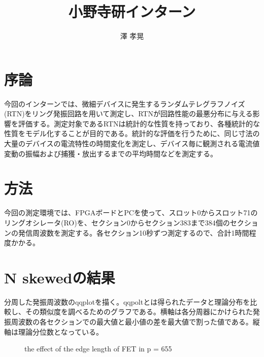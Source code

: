 \documentclass{jsarticle}
\begin{document}
\title{小野寺研インターン}
\author{澤 孝晃}
\maketitle

\section{序論}

今回のインターンでは、微細デバイスに発生するランダムテレグラフノイズ(RTN)をリング発振回路を用いて測定し、RTNが回路性能の最悪分布に与える影響を評価する。測定対象であるRTNは統計的な性質を持っており、各種統計的な性質をモデル化することが目的である。統計的な評価を行うために、同じ寸法の大量のデバイスの電流特性の時間変化を測定し、デバイス毎に観測される電流値変動の振幅および捕獲・放出するまでの平均時間などを測定する。

\section{方法}

今回の測定環境では、FPGAボードとPCを使って、スロット0からスロット71のリングオシレータ(RO)を、セクション0からセクション383まで384個のセクションの発信周波数を測定する。各セクション10秒ずつ測定するので、合計1時間程度かかる。

\section{N skewedの結果}

分周した発振周波数のqqplotを描く。qqpoltとは得られたデータと理論分布を比較し、その類似度を調べるためのグラフである。横軸は各分周器にかけられた発振周波数の各セクションでの最大値と最小値の差を最大値で割った値である。縦軸は理論分位数となっている。

\begin{figure}[H]
	\centering
	\caption{the effect of the edge length of FET in p = 655}
	\label{fig:the_effect_of_the_edge_length_of_fet_in_p_655}
\end{figure}
\end{document}
